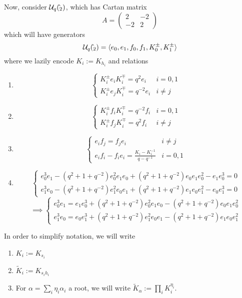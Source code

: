 \documentclass[11pt,leqno,oneside]{amsart}
\numberwithin{thm}{section}
\newcommand{\U}{\mathcal{U}}
\begin{document}
\begin{example}
  Now, consider \(\U_q(\hat{\sl}_2)\), which has Cartan matrix \[
    A = \left(
      \begin{array}{cc}
        2&-2\\
        -2&2
      \end{array}
    \right)
  \]
  which will have generators \[
    \U_q(\hat{\sl}_2) = \langle e_0, e_1, f_0, f_1, K_0^{\pm}, K_1^{\pm} \rangle
  \]
  where we lazily encode \(K_i := K_{h_i}\) and relations
  \begin{enumerate}
  \item \[
      \begin{cases}
        K_i^\pm e_i K_i^\mp = q^2 e_i & i = 0,1\\
        K_i^\pm e_j K_i^\mp = q^{-2} e_i & i \neq j
      \end{cases}
    \]
  \item \[
      \begin{cases}
        K_i^\pm f_i K_i^\mp = q^{-2} f_i & i = 0,1\\
        K_i^\pm f_j K_i^\mp = q^{2} f_i & i \neq j
      \end{cases}
    \]
  \item \[
      \begin{cases}
        e_i f_j = f_j e_i & i \neq j\\
        e_i f_i - f_i e_i = \frac{K_i - K_i^{-1}}{q-q^{-1}} & i = 0,1
      \end{cases}
    \]
  \item \[
      \begin{cases}
        e_0^3 e_1 - (q^2+1+q^{-2}) e_0^2 e_1 e_0 + (q^2+1+q^{-2}) e_0
        e_1 e_0^2 - e_1 e_0^3 = 0\\
        e_1^3 e_0 - (q^2+1+q^{-2}) e_1^2 e_0 e_1 + (q^2+1+q^{-2}) e_1
        e_0 e_1^2 - e_0 e_1^3 = 0
      \end{cases}
    \]\[
      \implies
      \begin{cases}
        e_0^3 e_1 = e_1 e_0^3  + (q^2+1+q^{-2}) e_0^2 e_1 e_0 -
        (q^2+1+q^{-2}) e_0 e_1 e_0^2\\
        e_1^3 e_0 = e_0 e_1^3 + (q^2+1+q^{-2}) e_1^2 e_0 e_1 -
        (q^2+1+q^{-2}) e_1 e_0 e_1^2
      \end{cases}
    \]
  \end{enumerate}
\end{example}
\begin{defn}
  In order to simplify notation, we will write
  \begin{enumerate}
  \item \(K_i := K_{s_i}\)
  \item \(\tilde{K}_i := K_{s_i h_i}\)
  \item For \(\alpha = \sum_i \eta_i \alpha_i\) a root, we will write
    \(\tilde{K}_\alpha := \prod_i K_i^{\eta_i}\).
  \end{enumerate}
\end{defn}
\end{document}
